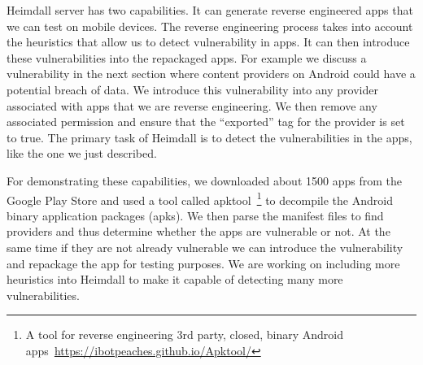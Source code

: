 \noindent
Heimdall server has two capabilities. It can generate reverse engineered apps that we can test on mobile devices. The reverse engineering process takes into account the heuristics that allow us to detect vulnerability in apps. It can then introduce these vulnerabilities into the repackaged apps. For example we discuss a vulnerability in the next section where content providers on Android could have a potential breach of data. We introduce this vulnerability into any provider associated with apps that we are reverse engineering. We then remove any associated permission and ensure that the ``exported'' tag for the provider is set to true. The primary task of Heimdall is to detect the vulnerabilities in the apps, like the one we just described.

For demonstrating these capabilities, we downloaded about 1500 apps from the Google Play Store and used a tool called apktool~\footnote{A tool for reverse engineering 3rd party, closed, binary Android apps~\url{https://ibotpeaches.github.io/Apktool/}} to decompile the Android binary application packages (apks). We then parse the manifest files to find providers and thus determine whether the apps are vulnerable or not. At the same time if they are not already vulnerable we can introduce the vulnerability and repackage the app for testing purposes. We are working on including more heuristics into Heimdall to make it capable of detecting many more vulnerabilities.